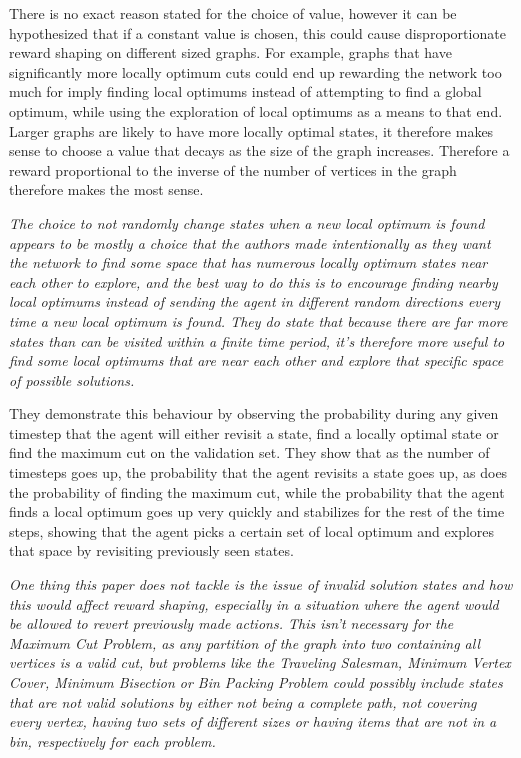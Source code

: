 \documentclass{article}
\begin{document}
There is no exact reason stated for the choice of value, however it can be hypothesized that if a constant value is chosen, this could cause disproportionate reward shaping on different sized graphs. For example, graphs that have significantly more locally optimum cuts could end up rewarding the network too much for imply finding local optimums instead of attempting to find a global optimum, while using the exploration of local optimums as a means to that end. Larger graphs are likely to have more locally optimal states, it therefore makes sense to choose a value that decays as the size of the graph increases. Therefore a reward proportional to the inverse of the number of vertices in the graph therefore makes the most sense. 

\textit{The choice to not randomly change states when a new local optimum is found appears to be mostly a choice that the authors made intentionally as they want the network to find some space that has numerous locally optimum states near each other to explore, and the best way to do this is to encourage finding nearby local optimums instead of sending the agent in different random directions every time a new local optimum is found. They do state that because there are far more states than can be visited within a finite time period, it's therefore more useful to find some local optimums that are near each other and explore that specific space of possible solutions.}

They demonstrate this behaviour by observing the probability during any given timestep that the agent will either revisit a state, find a locally optimal state or find the maximum cut on the validation set. They show that as the number of timesteps goes up, the probability that the agent revisits a state goes up, as does the probability of finding the maximum cut, while the probability that the agent finds a local optimum goes up very quickly and stabilizes for the rest of the time steps, showing that the agent picks a certain set of local optimum and explores that space by revisiting previously seen states.

\textit{One thing this paper does not tackle is the issue of invalid solution states and how this would affect reward shaping, especially in a situation where the agent would be allowed to revert previously made actions. This isn't necessary for the Maximum Cut Problem, as any partition of the graph into two containing all vertices is a valid cut, but problems like the Traveling Salesman, Minimum Vertex Cover, Minimum Bisection or Bin Packing Problem could possibly include states that are not valid solutions by either not being a complete path, not covering every vertex, having two sets of different sizes or having items that are not in a bin, respectively for each problem.}
\end{document}
